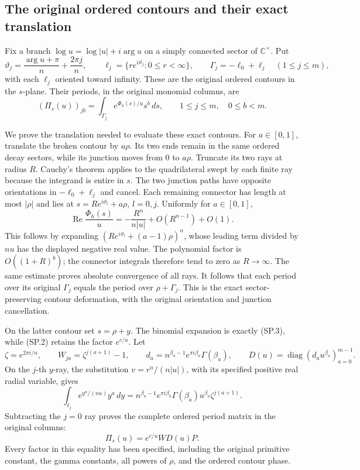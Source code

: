 \subsection{The original ordered contours and their exact translation}

Fix a branch \(\log u=\log|u|+i\arg u\) on a simply connected
sector of \(\mathbb C^\times\). Put
\[
 \vartheta_j=\frac{\arg u+\pi}{n}+\frac{2\pi j}{n},\qquad
 \ell_j=\{r e^{i\vartheta_j}:0\le r<\infty\},\qquad
 \Gamma_j=-\ell_0+\ell_j\quad(1\le j\le m),
 \tag{SP.10}\label{CFStage:eq:sp-contours}
\]
with each \(\ell_j\) oriented toward infinity.
These are the original ordered contours in the \(s\)-plane.
Their periods, in the original monomial columns, are
\[
 (\Pi_s(u))_{jb}
   =\int_{\Gamma_j} e^{\Phi_h(s)/u}s^b\,ds ,
       \qquad 1\le j\le m,\quad0\le b<m.
 \tag{SP.11}\label{CFStage:eq:sp-perioddef}
\]

We prove the translation needed to evaluate these exact contours.
For \(a\in[0,1]\), translate the broken contour by \(a\rho\).
Its two ends remain in the same ordered decay sectors, while
its junction moves from \(0\) to \(a\rho\).
Truncate its two rays at radius \(R\).
Cauchy's theorem applies to the quadrilateral swept by each
finite ray because the integrand is entire in \(s\).
The two junction paths have opposite orientations in
\(-\ell_0+\ell_j\) and cancel. Each remaining connector has
length at most \(|\rho|\) and lies at
\(s=R e^{i\vartheta_l}+a\rho\), \(l=0,j\).
Uniformly for \(a\in[0,1]\),
\[
 \operatorname{Re}\frac{\Phi_h(s)}u
 =-\frac{R^n}{n|u|}+O(R^{n-1})+O(1).
 \tag{SP.12}\label{CFStage:eq:sp-decay}
\]
This follows by expanding
\((R e^{i\vartheta_l}+(a-1)\rho)^n\), whose leading term
divided by \(nu\) has the displayed negative real value.
The polynomial factor is \(O((1+R)^b)\); the connector
integrals therefore tend to zero as \(R\to\infty\).
The same estimate proves absolute convergence of all rays.
It follows that each period over its original \(\Gamma_j\)
equals the period over \(\rho+\Gamma_j\).
This is the exact sector-preserving contour deformation,
with the original orientation and junction cancellation.

On the latter contour set \(s=\rho+y\).
The binomial expansion is exactly (SP.3), while (SP.2)
retains the factor \(e^{c/u}\).
Let
\[
 \zeta=e^{2\pi i/n},\qquad
 W_{ja}=\zeta^{j(a+1)}-1,\qquad
 d_a=n^{\beta_a-1}e^{\pi i\beta_a}\Gamma(\beta_a),\qquad
 D(u)=\operatorname{diag}(d_a u^{\beta_a})_{a=0}^{m-1}.
 \tag{SP.13}\label{CFStage:eq:sp-gamma}
\]
On the \(j\)-th \(y\)-ray, the substitution
\(v=r^n/(n|u|)\), with its specified positive real radial
variable, gives
\[
 \int_{\ell_j} e^{y^n/(nu)}y^a\,dy
 =n^{\beta_a-1}e^{\pi i\beta_a}
       \Gamma(\beta_a)u^{\beta_a}\zeta^{j(a+1)} .
 \]
Subtracting the \(j=0\) ray proves the complete ordered period
matrix in the original columns:
\[
 \boxed{\quad \Pi_s(u)=e^{c/u}W D(u)P .\quad}
 \tag{SP.14}\label{CFStage:eq:sp-periodmatrix}
\]
Every factor in this equality has been specified, including the
original primitive constant, the gamma constants, all powers of
\(\rho\), and the ordered contour phase.

